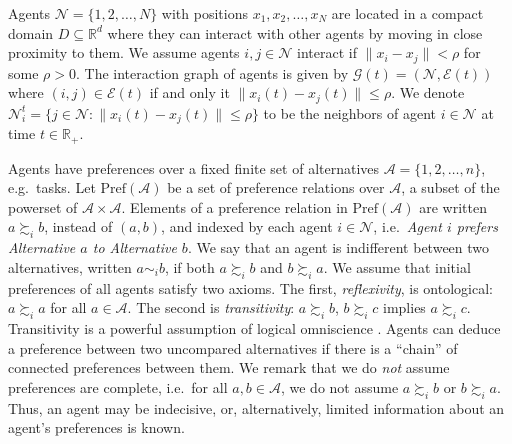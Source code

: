 \documentclass[conference]{ieeeconf}
\newcommand{\R}{\mathbb{R}}
\newcommand{\N}{\mathcal{N}}
\newcommand{\A}{\mathcal{A}}
\newcommand{\Pref}{\mathrm{Pref}}
\newcommand{\prefers}{\succsim}
\newcommand{\indif}{\sim}
\renewcommand{\leq}{\leqslant}
\newcommand{\graph}{\mathcal{G}}
\newcommand{\edges}{\mathcal{E}}
\begin{document}
Agents $\N = \{1,2,\dots, N\}$ with positions $x_1, x_2, \dots, x_N$ are located in a compact domain $D \subseteq \R^d$ where they can interact with other agents by moving in close proximity to them.
We assume agents $i, j \in \N$ interact if $\| x_i - x_j \| < \rho$ for some $\rho>0$. The interaction graph of agents is given by $\graph(t) = \left( \N, \edges(t) \right)$ where $(i,j) \in \mathcal{E}(t)$ if and only it $\| x_i(t) - x_j(t) \| \leq \rho$. We denote $\N_i^t = \{ j \in \N: \| x_i(t) - x_j(t) \| \leqslant \rho \}$ to be the neighbors of agent $i \in \N$ at time $t \in \R_{+}$.

Agents have preferences over a fixed finite set of alternatives $\A = \{1,2,\dots, n\}$, e.g.~tasks.  Let $\Pref(\A)$ be a set of preference relations over $\A$, a subset of the powerset of $\A \times \A$. Elements of a preference relation in $\Pref(\A)$ are written $a \prefers_i b$, instead of $(a,b)$, and indexed by each agent $i \in \N$, i.e.~\emph{Agent $i$ prefers Alternative $a$ to Alternative $b$}. We say that an agent is indifferent between two alternatives, written $a \indif_i b$, if both $a \prefers_i b$ and $b \prefers_i a$. We assume that initial preferences of all agents satisfy two axioms. The first, \emph{reflexivity}, is ontological: $a \prefers_i a$ for all $a \in \A$. The second is \emph{transitivity}: $a \prefers_i b$, $b \prefers_i c$ implies $a \prefers_i c$. Transitivity is a powerful assumption of logical omniscience \cite{fagin}. Agents can deduce a preference between two uncompared alternatives if there is a ``chain'' of connected preferences between them. We remark that we do \emph{not} assume preferences are complete, i.e.~for all $a,b \in \A$, we do not assume $a \prefers_i b$ or $b \prefers_i a$. Thus, an agent may be indecisive, or, alternatively, limited information about an agent's preferences is known.
\end{document}
